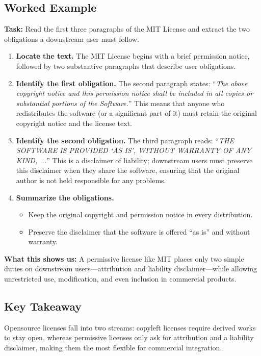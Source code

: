 \documentclass[12pt, a4paper]{article}
\begin{document}
\subsection{Worked Example}
\textbf{Task:} Read the first three paragraphs of the MIT License and extract the two obligations a downstream user must follow.

\begin{enumerate}
  \item \textbf{Locate the text.} The MIT License begins with a brief permission notice, followed by two substantive paragraphs that describe user obligations.
  \item \textbf{Identify the first obligation.} The second paragraph states: ``\emph{The above copyright notice and this permission notice shall be included in all copies or substantial portions of the Software.}'' This means that anyone who redistributes the software (or a significant part of it) must retain the original copyright notice and the license text.
  \item \textbf{Identify the second obligation.} The third paragraph reads: ``\emph{THE SOFTWARE IS PROVIDED `AS IS', WITHOUT WARRANTY OF ANY KIND, ...}'' This is a disclaimer of liability; downstream users must preserve this disclaimer when they share the software, ensuring that the original author is not held responsible for any problems.
  \item \textbf{Summarize the obligations.}  
  \begin{itemize}
    \item Keep the original copyright and permission notice in every distribution.
    \item Preserve the disclaimer that the software is offered ``as is'' and without warranty.
  \end{itemize}
\end{enumerate}
\textbf{What this shows us:} A permissive license like MIT places only two simple duties on downstream users---attribution and liability disclaimer---while allowing unrestricted use, modification, and even inclusion in commercial products.

\subsection{Key Takeaway}
Opensource licenses fall into two streams: copyleft licenses require derived works to stay open, whereas permissive licenses only ask for attribution and a liability disclaimer, making them the most flexible for commercial integration.
\end{document}
